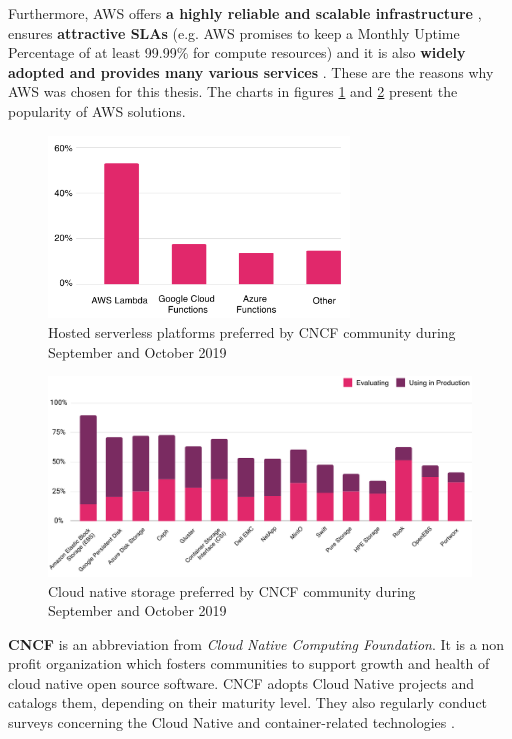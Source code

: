 Furthermore, AWS offers \textbf{a highly reliable and scalable infrastructure} \cite{article-aws-architecting}, ensures \textbf{attractive SLAs} (e.g. AWS promises to keep a Monthly Uptime Percentage of at least 99.99\% for compute resources) \cite{online-aws-sla} and it is also \textbf{widely adopted and provides many various services} \cite{cncf-2019}. These are the reasons why AWS was chosen for this thesis. The charts in figures \ref{fig:cncf-aws-pop1} and \ref{fig:cncf-aws-pop2} present the popularity of AWS solutions.

\begin{figure}[H]
    \centering
    \includegraphics[width=8cm]{figures/cncf-aws-pop1.png}
    \captionsetup{justification=centering,margin=2cm}
    \caption{Hosted serverless platforms preferred by CNCF community during September and October 2019 \cite{cncf-2019}}
    \label{fig:cncf-aws-pop1}
\end{figure}
\begin{figure}[H]
    \centering
    \includegraphics[width=13cm]{figures/cncf-aws-pop2.png}
    \captionsetup{justification=centering,margin=2cm}
    \caption{Cloud native storage preferred by CNCF community during September and October 2019 \cite{cncf-2019}}
    \label{fig:cncf-aws-pop2}
\end{figure}

\textbf{CNCF} is an abbreviation from \textit{Cloud Native Computing Foundation}. It is a non profit organization which fosters communities to support growth and health of cloud native open source software. CNCF adopts Cloud Native projects and catalogs them, depending on their maturity level. They also regularly conduct surveys concerning the Cloud Native and container-related technologies \cite{cncf-services}.



